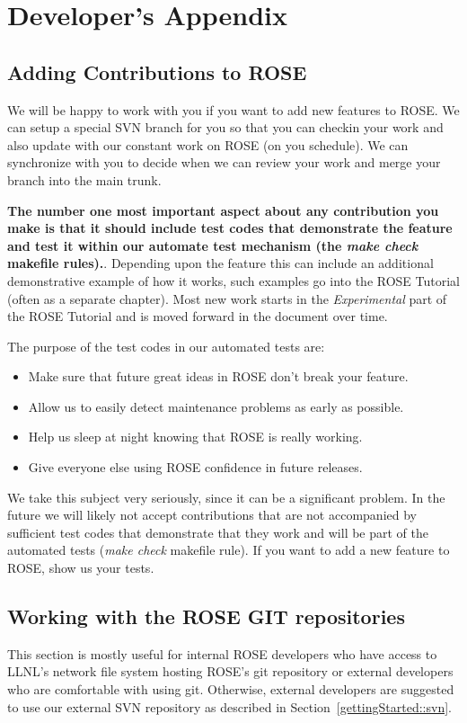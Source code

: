 
\chapter{ Developer's Appendix }
\label{developersAppendix:developersAppendix}

\section{Adding Contributions to ROSE}%

   We will be happy to work with you if you want to add new features to ROSE.
We can setup a special SVN branch for you so that you can checkin your work and
also update with our constant work on ROSE (on you schedule).  We can synchronize with 
you to decide when we can review your work and merge your branch into the main trunk.

{\bf The number one most important aspect about any contribution you make is that it
should include test codes that demonstrate the feature and test it within our 
automate test mechanism (the {\em make check} makefile rules).}. Depending upon the 
feature this can include an additional demonstrative example of how it works, such
examples go into the ROSE Tutorial (often as a separate chapter).  Most new work
starts in the {\em Experimental} part of the ROSE Tutorial and is moved forward
in the document over time.

The purpose of the test codes in our automated tests are:
\begin{itemize}
   \item Make sure that future great ideas in ROSE don't break your feature.
   \item Allow us to easily detect maintenance problems as early as possible.
   \item Help us sleep at night knowing that ROSE is really working.
   \item Give everyone else using ROSE confidence in future releases.
\end{itemize}

We take this subject very seriously, since it can be a significant problem.
In the future we will likely not accept contributions that are not accompanied 
by sufficient test codes that demonstrate that they work and will be part of the
automated tests ({\em make check} makefile rule).  If you want to add a new 
feature to ROSE, show us your tests.

\section{Working with the ROSE GIT repositories}
This section is mostly useful for internal ROSE developers who have access
to LLNL's network file system hosting ROSE's git repository or external
developers who are comfortable with using git. 
Otherwise, external developers are suggested to use our external SVN repository as
described in Section~\ref{gettingStarted::svn}.

